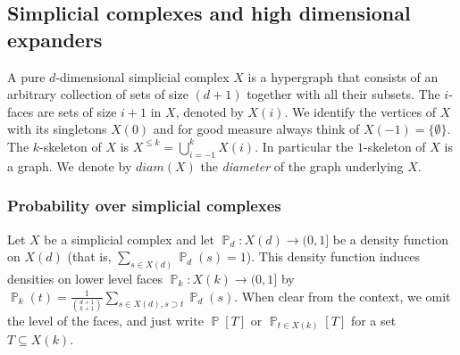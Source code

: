 \documentclass[10pt,a4paper]{article}
\theoremstyle{definition}
\theoremstyle{remark}
\newcommand{\abs}[1]{\lvert#1\rvert}
\newcommand\sett[2]{\left\{ #1 \left| \; \vphantom{#1 #2} \right. #2  \right\}}
\newcommand{\set}[1]{\{#1\}}
\newcommand{\Psymb}{\mathbb{P}}
\DeclareMathOperator*{\ProbOp}{\Psymb}
\renewcommand{\Pr}{\ProbOp}
\newcommand{\Prob}[2][]{\Pr_{{#1}}\left[#2\right]} %
\renewcommand{\leq}{\leqslant}
\numberwithin{equation}{section}
\newcommand{\dunion}{\mathbin{\mathaccent\cdot\cup}}
\newcommand{\dir}[1]{\overset{\to}{#1}}
\begin{document}
\subsection{Simplicial complexes and high dimensional expanders}
A pure \(d\)-dimensional simplicial complex \(X\) is a hypergraph that consists of an arbitrary collection of sets of size \((d+1)\) together with all their subsets. The $i$-faces are sets of size \(i+1\) in \(X\), denoted by \(X(i)\). We identify the vertices of \(X\) with its singletons \(X(0)\) and for good measure always think of \(X(-1) = \set{\emptyset}\). The \(k\)-skeleton of \(X\) is \(X^{\leq k} = \bigcup_{i=-1}^k X(i)\). In particular the \(1\)-skeleton of \(X\) is a graph. We denote by \(diam(X)\) the \emph{diameter} of the graph underlying $X$.

%

\subsubsection{Probability over simplicial complexes}
Let \(X\) be a simplicial complex and let \(\Pr_d:X(d)\to (0,1]\) be a density function on \(X(d)\) (that is, \(\sum_{s \in X(d)}\Pr_d(s)=1\)). This density function induces densities on lower level faces \(\Pr_k:X(k)\to (0,1]\) by \(\Pr_k(t) = \frac{1}{\binom{d+1}{k+1}}\sum_{s \in X(d),s \supset t} \Pr_d(s)\). %
When clear from the context, we omit the level of the faces, and just write \(\Pr[T]\) or \(\Prob[t \in X(k)]{T}\) for a set \(T \subseteq X(k)\).
\end{document}

